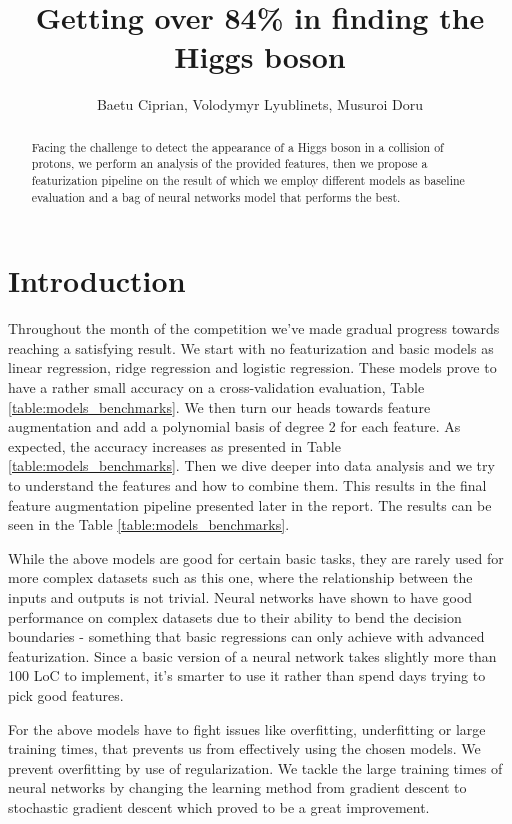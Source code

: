 \documentclass[10pt,conference,compsocconf]{IEEEtran}
\begin{document}
\title{Getting over 84\% in finding the Higgs boson}

\author{
	Baetu Ciprian, Volodymyr Lyublinets, Musuroi Doru
}

\maketitle

\begin{abstract}
Facing the challenge to detect the appearance of a Higgs boson in a collision of protons, we perform an analysis of the provided features, then we propose a featurization pipeline on the result of which we employ different models as baseline evaluation and a bag of neural networks model that performs the best.
\end{abstract}

\section{Introduction}
Throughout the month of the competition we've made gradual progress towards reaching a satisfying result. 
We start with no featurization and basic models as linear regression, ridge regression and logistic regression. These models prove to have a rather small accuracy on a cross-validation evaluation, Table \ref{table:models_benchmarks}. 
We then turn our heads towards feature augmentation and add a polynomial basis of degree 2 for each feature. As expected, the accuracy increases as presented in Table \ref{table:models_benchmarks}. 
Then we dive deeper into data analysis and we try to understand the features and how to combine them. This results in the final feature augmentation pipeline presented later in the report. The results can be seen in the Table \ref{table:models_benchmarks}. 

While the above models are good for certain basic tasks, they are rarely used for more complex datasets such as this one, where the relationship between the inputs and outputs is not trivial. Neural networks have shown to have good performance on complex datasets due to their ability to bend the decision boundaries - something that basic regressions can only achieve with advanced featurization. Since a basic version of a neural network takes slightly more than 100 LoC to implement, it's smarter to use it rather than spend days trying to pick good features.

For the above models have to fight issues like overfitting, underfitting or large training times, that prevents us from effectively using the chosen models. We prevent overfitting by use of regularization. We tackle the large training times of neural networks by changing the learning method from gradient descent to stochastic gradient descent which proved to be a great improvement.
\end{document}
